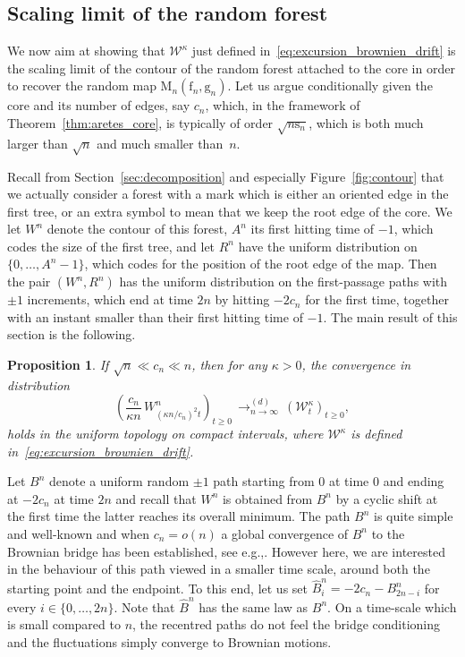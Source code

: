 \documentclass[11pt]{article}
\newcommand{\eg}{e.g.,\xspace}
\theoremstyle{plain}
\newtheorem{proposition}[theorem]{Proposition}
\theoremstyle{definition}
\theoremstyle{remark}
\newcommand{\Map}{\mathrm{M}}
\newcommand{\face}{\mathrm{f}}
\newcommand{\gen}{\mathrm{g}}
\newcommand{\spar}{\mathrm{s}}
\newcommand{\cvloi}[1][n]{\,\mathop{\longrightarrow}^{(d)}_{#1 \to \infty}\,}
\begin{document}
\subsection{Scaling limit of the random forest}

We now aim at showing that $\mathcal{W}^\kappa$ just defined in~\eqref{eq:excursion_brownien_drift} is the scaling limit of the contour of the random forest attached to the core in order to recover the random map $\Map_n(\face_n, \gen_n)$.
Let us argue conditionally given the core and its number of edges, say $c_n$, which, in the framework of Theorem~\ref{thm:aretes_core}, is typically of order $\sqrt{n \spar_n}$, which is both much larger than $\sqrt{n}$ and much smaller than~$n$.

Recall from Section~\ref{sec:decomposition} and especially Figure~\ref{fig:contour} that we actually consider a forest with a mark which is either an oriented edge in the first tree, or an extra symbol to mean that we keep the root edge of the core. We let $W^n$ denote the contour of this forest, $A^n$ its first hitting time of $-1$, which codes the size of the first tree, and let $R^n$ have the uniform distribution on $\{0, \dots, A^n-1\}$, which codes for the position of the root edge of the map. Then the pair $(W^n, R^n)$ has the uniform distribution on the first-passage paths with $\pm1$ increments, which end at time $2n$ by hitting $-2c_n$ for the first time, together with an instant smaller than their first hitting time of $-1$.
The main result of this section is the following.

\begin{proposition}\label{prop:cv_contour_brownien_drift}
If $\sqrt{n} \ll c_n \ll n$, then for any $\kappa >0$, the convergence in distribution
\[
\left(\frac{c_{n}}{\kappa n}\, W^{n}_{(\kappa n/c_{n})^2 t}\right)_{t \ge 0}
\cvloi \left(\mathcal{W}^{\kappa}_{t}\right)_{t \ge 0},
\]
holds in the uniform topology on compact intervals, where $\mathcal{W}^\kappa$ is defined in~\eqref{eq:excursion_brownien_drift}.
\end{proposition}

Let $B^n$ denote a uniform random $\pm1$ path starting from $0$ at time $0$ and ending at $-2c_n$ at time $2n$ and recall that $W^n$ is obtained from $B^n$ by a cyclic shift at the first time the latter reaches its overall minimum.
The path $B^n$ is quite simple and well-known and when $c_n=o(n)$ a global convergence of $B^n$ to the Brownian bridge has been established, see \eg \cite[Th.\,20.7]{Ald85}.
However here, we are interested in the behaviour of this path viewed in a smaller time scale, around both the starting point and the endpoint. To this end, let us set $\widehat{B}^{n}_{i} = -2c_{n}-B^{n}_{2n-i}$ for every $i \in \{0, \dots, 2n\}$. Note that $\widehat{B}^{n}$ has the same law as $B^{n}$.
On a time-scale which is small compared to $n$, the recentred paths do not feel the bridge conditioning and the fluctuations simply converge to Brownian motions.
\end{document}
